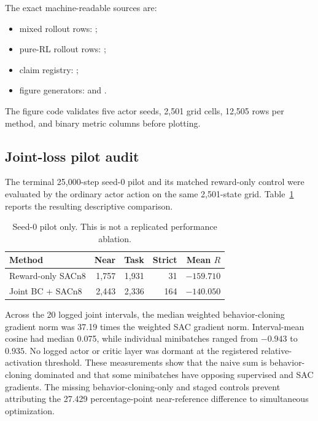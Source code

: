 \documentclass[10pt,twocolumn]{article}
\begin{document}
\scriptsize
The exact machine-readable sources are:
\begin{itemize}
\item mixed rollout rows: ;
\item pure-RL rollout rows: ;
\item claim registry: ;
\item figure generators:  and .
\end{itemize}
The figure code validates five actor seeds, 2,501 grid cells, 12,505 rows per method, and binary metric columns before plotting.
\footnotesize

\subsection{Joint-loss pilot audit}

The terminal 25,000-step seed-0 pilot and its matched reward-only control were evaluated by the ordinary actor action on the same 2,501-state grid. Table~\ref{tab:joint-pilot} reports the resulting descriptive comparison.

\begin{table}[h]
\centering
\scriptsize
\setlength{\tabcolsep}{3pt}
\caption{Seed-0 pilot only. This is not a replicated performance ablation.}
\label{tab:joint-pilot}
\begin{tabular}{lrrrr}
\toprule
Method & Near & Task & Strict & Mean $R$\\
\midrule
Reward-only SACn8 & 1,757 & 1,931 & 31 & $-159.710$\\
Joint BC + SACn8 & 2,443 & 2,336 & 164 & $-140.050$\\
\bottomrule
\end{tabular}
\end{table}

Across the 20 logged joint intervals, the median weighted behavior-cloning gradient norm was 37.19 times the weighted SAC gradient norm. Interval-mean cosine had median 0.075, while individual minibatches ranged from $-0.943$ to $0.935$. No logged actor or critic layer was dormant at the registered relative-activation threshold. These measurements show that the naive sum is behavior-cloning dominated and that some minibatches have opposing supervised and SAC gradients. The missing behavior-cloning-only and staged controls prevent attributing the 27.429 percentage-point near-reference difference to simultaneous optimization.
\end{document}

